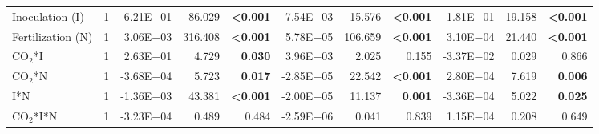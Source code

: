 \begin{landscape}
\begin{table}
{\begin{tabular}{p{3cm}p{0.5cm}p{1.75cm}p{1.5cm}p{1.5cm}p{1.75cm}p{1.5cm}p{1.5cm}p{1.75cm}p{1.5cm}p{1.5cm}}
            Inoculation (I) & \multicolumn{1}{r}{1}
            & \multicolumn{1}{r}{6.21E$-$01}  & \multicolumn{1}{r}{ 86.029}  & \multicolumn{1}{r}{\textbf{<0.001}}
            & \multicolumn{1}{r}{7.54E$-$03}  & \multicolumn{1}{r}{ 15.576}  & \multicolumn{1}{r}{\textbf{<0.001}}
            & \multicolumn{1}{r}{1.81E$-$01}  & \multicolumn{1}{r}{ 19.158}  & \multicolumn{1}{r}{\textbf{<0.001}} 
            \\

            Fertilization (N) & \multicolumn{1}{r}{1}
            & \multicolumn{1}{r}{3.06E$-$03}  & \multicolumn{1}{r}{316.408}  & \multicolumn{1}{r}{\textbf{<0.001}}
            & \multicolumn{1}{r}{5.78E$-$05}  & \multicolumn{1}{r}{106.659}  & \multicolumn{1}{r}{\textbf{<0.001}}
            & \multicolumn{1}{r}{3.10E$-$04}  & \multicolumn{1}{r}{ 21.440}  & \multicolumn{1}{r}{\textbf{<0.001}} 
            \\

            CO$_2$*I & \multicolumn{1}{r}{1}
            & \multicolumn{1}{r}{ 2.63E$-$01} & \multicolumn{1}{r}{  4.729}  & \multicolumn{1}{r}{\textbf{ 0.030}}
            & \multicolumn{1}{r}{ 3.96E$-$03} & \multicolumn{1}{r}{  2.025}  & \multicolumn{1}{r}{0.155}
            & \multicolumn{1}{r}{-3.37E$-$02} & \multicolumn{1}{r}{  0.029}  & \multicolumn{1}{r}{0.866} 
            \\

            CO$_2$*N & \multicolumn{1}{r}{1}
            & \multicolumn{1}{r}{-3.68E$-$04} & \multicolumn{1}{r}{  5.723}  & \multicolumn{1}{r}{\textbf{ 0.017}}
            & \multicolumn{1}{r}{-2.85E$-$05} & \multicolumn{1}{r}{ 22.542}  & \multicolumn{1}{r}{\textbf{<0.001}}
            & \multicolumn{1}{r}{ 2.80E$-$04} & \multicolumn{1}{r}{  7.619}  & \multicolumn{1}{r}{\textbf{0.006}} 
            \\

            I*N & \multicolumn{1}{r}{1}
            & \multicolumn{1}{r}{-1.36E$-$03}  & \multicolumn{1}{r}{ 43.381}  & \multicolumn{1}{r}{\textbf{<0.001}}
            & \multicolumn{1}{r}{-2.00E$-$05}  & \multicolumn{1}{r}{ 11.137}  & \multicolumn{1}{r}{\textbf{ 0.001}}
            & \multicolumn{1}{r}{-3.36E$-$04}  & \multicolumn{1}{r}{  5.022}  & \multicolumn{1}{r}{\textbf{ 0.025}} 
            \\

            CO$_2$*I*N & \multicolumn{1}{r}{1}
            & \multicolumn{1}{r}{-3.23E$-$04}  & \multicolumn{1}{r}{  0.489}  & \multicolumn{1}{r}{0.484}
            & \multicolumn{1}{r}{-2.59E$-$06}  & \multicolumn{1}{r}{  0.041}  & \multicolumn{1}{r}{0.839}
            & \multicolumn{1}{r}{ 1.15E$-$04}  & \multicolumn{1}{r}{  0.208}  & \multicolumn{1}{r}{0.649} 
            \\
            \hline


\end{tabular}}
\end{table}
\end{landscape}
